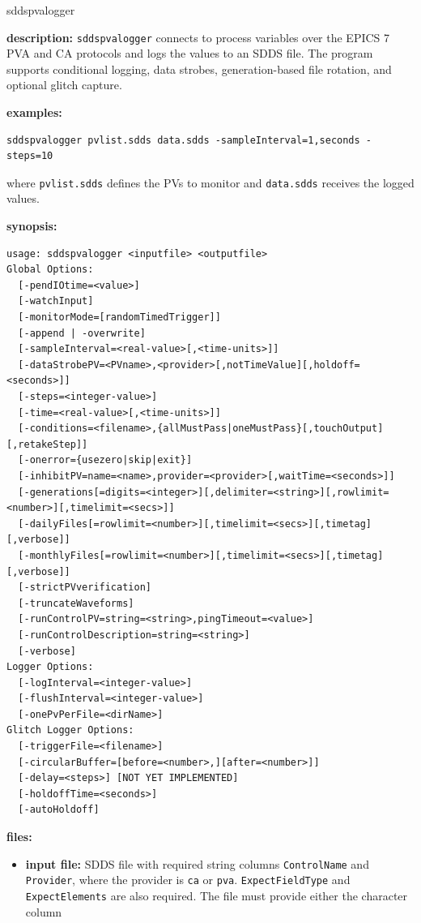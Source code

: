 \begin{sddsprog}{sddspvalogger}
\item \textbf{description:}
\verb+sddspvalogger+ connects to process variables over the EPICS 7 PVA and CA protocols and logs the values to an SDDS file. The program supports conditional logging, data strobes, generation-based file rotation, and optional glitch capture.
\item \textbf{examples:}
\begin{verbatim}
sddspvalogger pvlist.sdds data.sdds -sampleInterval=1,seconds -steps=10
\end{verbatim}
where {\tt pvlist.sdds} defines the PVs to monitor and {\tt data.sdds} receives the logged values.
\item \textbf{synopsis:}
\begin{verbatim}
usage: sddspvalogger <inputfile> <outputfile>
Global Options:
  [-pendIOtime=<value>]
  [-watchInput]
  [-monitorMode=[randomTimedTrigger]]
  [-append | -overwrite]
  [-sampleInterval=<real-value>[,<time-units>]]
  [-dataStrobePV=<PVname>,<provider>[,notTimeValue][,holdoff=<seconds>]]
  [-steps=<integer-value>]
  [-time=<real-value>[,<time-units>]]
  [-conditions=<filename>,{allMustPass|oneMustPass}[,touchOutput][,retakeStep]]
  [-onerror={usezero|skip|exit}]
  [-inhibitPV=name=<name>,provider=<provider>[,waitTime=<seconds>]]
  [-generations[=digits=<integer>][,delimiter=<string>][,rowlimit=<number>][,timelimit=<secs>]]
  [-dailyFiles[=rowlimit=<number>][,timelimit=<secs>][,timetag][,verbose]]
  [-monthlyFiles[=rowlimit=<number>][,timelimit=<secs>][,timetag][,verbose]]
  [-strictPVverification]
  [-truncateWaveforms]
  [-runControlPV=string=<string>,pingTimeout=<value>]
  [-runControlDescription=string=<string>]
  [-verbose]
Logger Options:
  [-logInterval=<integer-value>]
  [-flushInterval=<integer-value>]
  [-onePvPerFile=<dirName>]
Glitch Logger Options:
  [-triggerFile=<filename>]
  [-circularBuffer=[before=<number>,][after=<number>]]
  [-delay=<steps>] [NOT YET IMPLEMENTED]
  [-holdoffTime=<seconds>]
  [-autoHoldoff]
\end{verbatim}
\item \textbf{files:}
\begin{itemize}
  \item \textbf{input file:} SDDS file with required string columns
    \verb|ControlName| and \verb|Provider|, where the provider is \verb|ca| or
    \verb|pva|. \verb|ExpectFieldType| and \verb|ExpectElements| are also
    required. The file must provide either the character column

\end{itemize}
\end{sddsprog}
